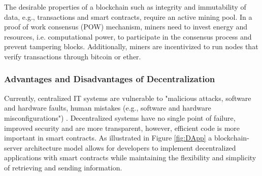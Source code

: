 		The desirable properties of a \gls{blockchain} such as integrity and immutability of data, e.g., transactions and
		smart contracts, require an active mining pool. In a proof of work consensus (POW) mechanism,  miners need to invest energy and resources,
		i.e. computational power, to participate in the consensus process and prevent tampering blocks. Additionally, miners are incentivized to run nodes that verify transactions through bitcoin or ether. %
%		
%		

	
	
	

\subsubsection{Advantages and Disadvantages of Decentralization }
Currently, centralized IT systems are vulnerable to "malicious attacks, software and hardware faults, human mistakes (e.g., software and hardware misconfigurations") \cite{5936160}. Decentralized systems have no single point of failure, improved security and are more transparent, however, efficient code is more important in smart contracts. As illustrated in Figure \ref*{fig:DApp} a \gls{blockchain}-server architecture model allows for developers to implement decentralized applications with smart contracts while maintaining the flexibility and simplicity of retrieving and sending information.	

